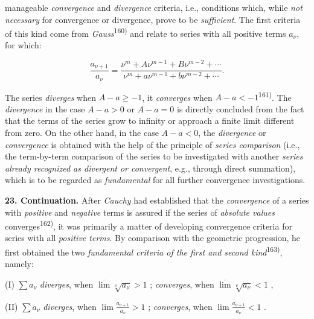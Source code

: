 \thispagestyle{fancy}

\vspace{0.5cm}

manageable \textit{convergence} and \textit{divergence} criteria, i.e., conditions which, while \textit{not necessary} for convergence or divergence, prove to be \textit{sufficient}. The first criteria of this kind come from \textit{Gauss}\textsuperscript{160)} and relate to series with all positive terms $a_\nu$, for which:

\vspace{-0.2cm}
$$\frac{a_{\nu+1}}{a_\nu} = \frac{\nu^m + A\nu^{m-1} + B\nu^{m-2} + \cdots}{\nu^m + a\nu^{m-1} + b\nu^{m-2} + \cdots} .$$

The series \textit{diverges} when $A - a \geq -1$, it \textit{converges} when $A - a < -1$\textsuperscript{161)}. The \textit{divergence} in the case $A - a > 0$ or $A - a = 0$ is directly concluded from the fact that the terms of the series grow to infinity or approach a finite limit different from zero. On the other hand, in the case $A - a < 0$, the \textit{divergence} or \textit{convergence} is obtained with the help of the principle of \textit{series comparison} (i.e., the term-by-term comparison of the series to be investigated with another \textit{series already recognized as divergent or convergent}, e.g., through direct summation), which is to be regarded as \textit{fundamental} for all further convergence investigations.

\vspace{0.3cm}
\textbf{23. Continuation.} After \textit{Cauchy} had established that the \textit{convergence} of a series with \textit{positive} and \textit{negative} terms is assured if the series of \textit{absolute values} converges\textsuperscript{162)}, it was primarily a matter of developing convergence criteria for series with all \textit{positive terms}. By comparison with the geometric progression, he first obtained the two \textit{fundamental criteria of the first and second kind}\textsuperscript{163)}, namely:

\vspace{0.1cm}
(I) $\sum a_\nu$ \textit{ diverges}, when  $\overline{\lim} \sqrt[\nu]{a_\nu} > 1$ ; \textit{ converges}, when  $\overline{\lim} \sqrt[\nu]{a_\nu} < 1$ ,

(II) $\sum a_\nu$ \textit{ diverges}, when  $\lim \frac{a_{\nu + 1}}{a_\nu} > 1$ ; \textit{ converges}, when  $\lim \frac{a_{\nu + 1}}{a_\nu} < 1$ .
\vspace{0.1cm}


